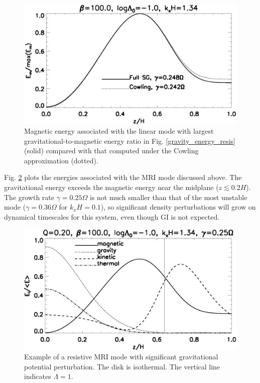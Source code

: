 \begin{figure}
  \includegraphics[width=\linewidth]{figures/compare_result_cowling}
  \caption{Magnetic energy associated with the linear mode with
    largest gravitational-to-magnetic energy ratio in 
    Fig. \ref{gravity_energy_resis} (solid) compared with that computed
    under the Cowling approximation (dotted). %
    \label{mri_massive_cowling}}
\end{figure}

Fig. \ref{mri_massive_resis} plots the energies associated with the 
MRI mode discussed above. 
The gravitational energy exceeds the 
magnetic energy near the midplane ($z\lesssim0.2H$). The growth rate
$\gamma=0.25\Omega$ is not much smaller than that of the most unstable
mode ($\gamma=0.36\Omega$ for $k_xH=0.1$), so significant density
perturbations will grow on dynamical timescales for this
system, even though GI is not expected.

\begin{figure}
  \includegraphics[width=\linewidth]{figures/result_resis_sg}
  \caption{Example of a resistive MRI mode with significant
    gravitational potential perturbation. The disk is isothermal. 
    The vertical line
    indicates $\Lambda=1$.  
    \label{mri_massive_resis}}
\end{figure}

